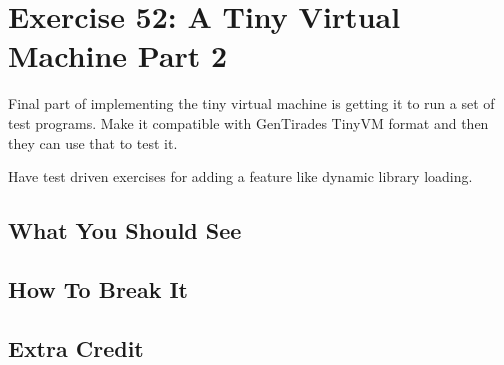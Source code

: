 \chapter{Exercise 52: A Tiny Virtual Machine Part 2}

Final part of implementing the tiny virtual machine is getting it to run a set of 
test programs.  Make it compatible with GenTirades TinyVM format and then they
can use that to test it.

Have test driven exercises for adding a feature like dynamic library loading.


\section{What You Should See}


\section{How To Break It}


\section{Extra Credit}



